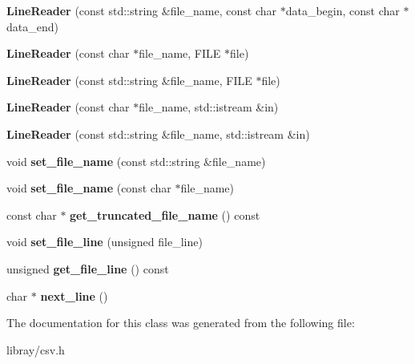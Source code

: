 \begin{DoxyCompactItemize}
\item 
\mbox{\label{classio_1_1LineReader_a0a52d864b46442a253443cac1367366e}} 
{\bfseries Line\+Reader} (const std\+::string \&file\+\_\+name, const char $\ast$data\+\_\+begin, const char $\ast$data\+\_\+end)
\item 
\mbox{\label{classio_1_1LineReader_ad2a8943ba0848ae5052e2f5ad30c010e}} 
{\bfseries Line\+Reader} (const char $\ast$file\+\_\+name, F\+I\+LE $\ast$file)
\item 
\mbox{\label{classio_1_1LineReader_a93fa2e3ae98b0e7a7391714d6395c552}} 
{\bfseries Line\+Reader} (const std\+::string \&file\+\_\+name, F\+I\+LE $\ast$file)
\item 
\mbox{\label{classio_1_1LineReader_a301c08eb9ca5d3fdccf4e9a8e5ac82f8}} 
{\bfseries Line\+Reader} (const char $\ast$file\+\_\+name, std\+::istream \&in)
\item 
\mbox{\label{classio_1_1LineReader_a3eacf4d1539a24122c6897fce4e72f06}} 
{\bfseries Line\+Reader} (const std\+::string \&file\+\_\+name, std\+::istream \&in)
\item 
\mbox{\label{classio_1_1LineReader_a1a0763d491dec16cebc33134e965dfee}} 
void {\bfseries set\+\_\+file\+\_\+name} (const std\+::string \&file\+\_\+name)
\item 
\mbox{\label{classio_1_1LineReader_a81c56ac68497da5ec874333ce063fd83}} 
void {\bfseries set\+\_\+file\+\_\+name} (const char $\ast$file\+\_\+name)
\item 
\mbox{\label{classio_1_1LineReader_ad5817da6af1ae77daddec7aeaeebf2f8}} 
const char $\ast$ {\bfseries get\+\_\+truncated\+\_\+file\+\_\+name} () const
\item 
\mbox{\label{classio_1_1LineReader_a581b55d4ced6adb964de50fa8ac6eb08}} 
void {\bfseries set\+\_\+file\+\_\+line} (unsigned file\+\_\+line)
\item 
\mbox{\label{classio_1_1LineReader_a3f3459e22ed8e459238c290050b6722e}} 
unsigned {\bfseries get\+\_\+file\+\_\+line} () const
\item 
\mbox{\label{classio_1_1LineReader_a97f4e0129611d9da2b8c966ffe670be5}} 
char $\ast$ {\bfseries next\+\_\+line} ()
\end{DoxyCompactItemize}


The documentation for this class was generated from the following file\+:\begin{DoxyCompactItemize}
\item 
libray/csv.\+h\end{DoxyCompactItemize}
